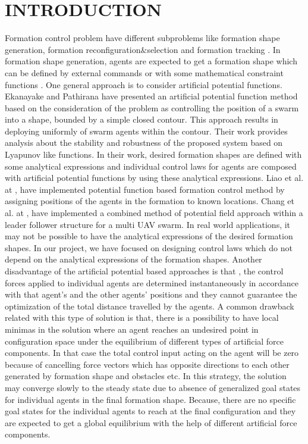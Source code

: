 \documentclass[letterpaper, 10 pt, conference]{ieeeconf}  %
\begin{document}
\section{INTRODUCTION}
Formation control problem have different subproblems like formation shape generation, formation reconfiguration$\&$selection and formation tracking \cite{12}.  
In formation shape generation, agents are expected to get a formation shape which can be defined by external commands or with some mathematical constraint functions \cite{16}.  One general approach is to consider artificial potential functions. Ekanayake and Pathirana \cite{17} have presented an artificial potential function method  based on the consideration of the problem as controlling the position of a swarm into a shape, bounded by a simple closed contour. This approach results in deploying uniformly of swarm agents within the contour.  Their work provides analysis about the stability and robustness of the proposed system based on Lyapunov like functions. In their work, desired formation shapes are defined with some analytical expressions and individual control laws for agents are composed with artificial potential functions by using these analytical expressions. Liao et al. at \cite{504}, have implemented potential function based formation control method by assigning positions of the agents in the formation to known locations. Chang et al. at \cite{505}, have implemented a combined method of potential field approach within a leader follower structure for a multi UAV swarm. In real world applications, it may not be possible to have the analytical expressions of the desired formation shapes. In our project, we have focused on designing control laws which do not depend on the analytical expressions of the formation shapes. Another disadvantage of the artificial potential based approaches is that , the control forces applied to individual agents are determined instantaneously in accordance with that agent's and the other agents' positions and they cannot guarantee the optimization of the total distance travelled by the agents. A common drawback related with this type of solution is that, there is a possibility to have local minimas in the solution where an agent reaches an undesired point in configuration space under the equilibrium of different types of artificial force components. In that case the total control input acting on the agent will be zero because of cancelling force vectors which has opposite directions to each other generated by formation shape and obstacles etc. In this strategy, the solution may converge slowly to the steady state due to absence of generalized goal states for individual agents in the final formation shape. Because, there are no specific goal states for the individual agents to reach at the final configuration and they are expected to get a global equilibrium with the help of different artificial force components. 
\end{document}
